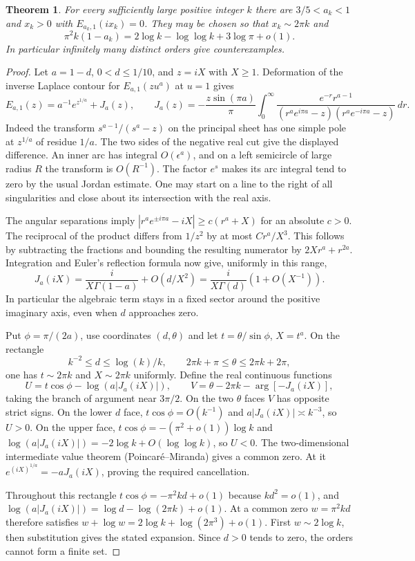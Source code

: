 \documentclass[11pt,a4paper]{article}
\newtheorem{theorem}{Theorem}[section]
\numberwithin{equation}{section}
\begin{document}
\begin{theorem}\label{th:imaginary}
For every sufficiently large positive integer $k$ there are
$3/5<a_k<1$ and $x_k>0$ with $E_{a_k,1}(ix_k)=0$.
They may be chosen so that $x_k\sim 2\pi k$ and
\[
 \pi^2 k(1-a_k)=2\log k-\log\log k+3\log\pi+o(1).
\]
In particular infinitely many distinct orders give counterexamples.
\end{theorem}
\begin{proof}
Let $a=1-d$, $0<d\le1/10$, and $z=iX$ with $X\ge1$.
Deformation of the inverse Laplace contour for $E_{a,1}(zu^a)$
at $u=1$ gives
\[
 E_{a,1}(z)=a^{-1}e^{z^{1/a}}+J_a(z),\qquad
 J_a(z)=-\frac{z\sin(\pi a)}{\pi}
 \int_0^\infty\frac{e^{-r}r^{a-1}}
 {(r^ae^{i\pi a}-z)(r^ae^{-i\pi a}-z)}\,dr .
\]
Indeed the transform $s^{a-1}/(s^a-z)$ on the principal sheet has
one simple pole at $z^{1/a}$ of residue $1/a$. The two sides of the
negative real cut give the displayed difference. An inner arc has
integral $O(\epsilon^a)$, and on a left semicircle of large radius
$R$ the transform is $O(R^{-1})$. The factor $e^s$ makes its arc
integral tend to zero by the usual Jordan estimate. One may start
on a line to the right of all singularities and close about its
intersection with the real axis.

The angular separations imply
$|r^ae^{\pm i\pi a}-iX|\ge c(r^a+X)$ for an absolute $c>0$.
The reciprocal of the product differs from $1/z^2$ by at most
$C r^a/X^3$. This follows by subtracting the fractions and bounding
the resulting numerator by $2Xr^a+r^{2a}$. Integration and Euler's
reflection formula now give, uniformly in this range,
\[
 J_a(iX)=\frac{i}{X\Gamma(1-a)}+O(d/X^2)
 =\frac{i}{X\Gamma(d)}(1+O(X^{-1})).
\]
In particular the algebraic term stays in a fixed sector around the
positive imaginary axis, even when $d$ approaches zero.

Put $\phi=\pi/(2a)$, use coordinates $(d,\theta)$ and let
$t=\theta/\sin\phi$, $X=t^a$. On the rectangle
\[
 k^{-2}\le d\le\log(k)/k,\qquad
 2\pi k+\pi\le\theta\le2\pi k+2\pi ,
\]
one has $t\sim2\pi k$ and $X\sim2\pi k$ uniformly. Define the real
continuous functions
\[
 U=t\cos\phi-\log(a|J_a(iX)|),\qquad
 V=\theta-2\pi k-\arg[-J_a(iX)],
\]
taking the branch of argument near $3\pi/2$. On the two $\theta$
faces $V$ has opposite strict signs. On the lower $d$ face,
$t\cos\phi=O(k^{-1})$ and $a|J_a(iX)|\asymp k^{-3}$, so $U>0$.
On the upper face,
$t\cos\phi=-(\pi^2+o(1))\log k$ and
$\log(a|J_a(iX)|)=-2\log k+O(\log\log k)$, so $U<0$.
The two-dimensional intermediate value theorem (Poincar\'e--Miranda)
gives a common zero. At it
$e^{(iX)^{1/a}}=-aJ_a(iX)$, proving the required cancellation.

Throughout this rectangle
$t\cos\phi=-\pi^2kd+o(1)$ because $kd^2=o(1)$, and
$\log(a|J_a(iX)|)=\log d-\log(2\pi k)+o(1)$.
At a common zero $w=\pi^2kd$ therefore satisfies
$w+\log w=2\log k+\log(2\pi^3)+o(1)$.
First $w\sim2\log k$, then substitution gives the stated expansion.
Since $d>0$ tends to zero, the orders cannot form a finite set.
\end{proof}
\end{document}
